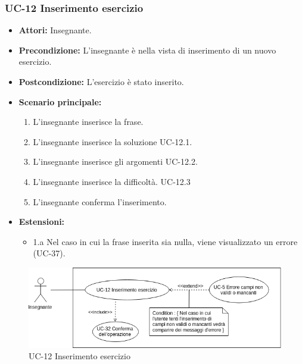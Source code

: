 \subsubsection{UC-12 Inserimento esercizio}
	\begin{itemize}
		\item \textbf{Attori: }Insegnante.
		\item \textbf{Precondizione: }L'insegnante è nella vista di inserimento di un nuovo esercizio.
		\item \textbf{Postcondizione: }L'esercizio è stato inserito.
		\item \textbf{Scenario principale: }
		\begin{enumerate} 
		\item L'insegnante inserisce la frase.
		\item L'insegnante inserisce la soluzione UC-12.1.
		\item L'insegnante inserisce gli argomenti UC-12.2.
		\item L'insegnante inserisce la difficoltà. UC-12.3
		\item L'insegnante conferma l'inserimento.
		\end{enumerate}
		\item \textbf{Estensioni:} 
		\begin{itemize}
		\item 1.a Nel caso in cui la frase inserita sia nulla, viene visualizzato un errore (UC-37).
		\end{itemize}
	\end{itemize}
	\begin{figure}[h]
		\centering
		\includegraphics[scale=0.7]{images/UC-12.png}
		\caption{UC-12 Inserimento esercizio}
	\end{figure}

